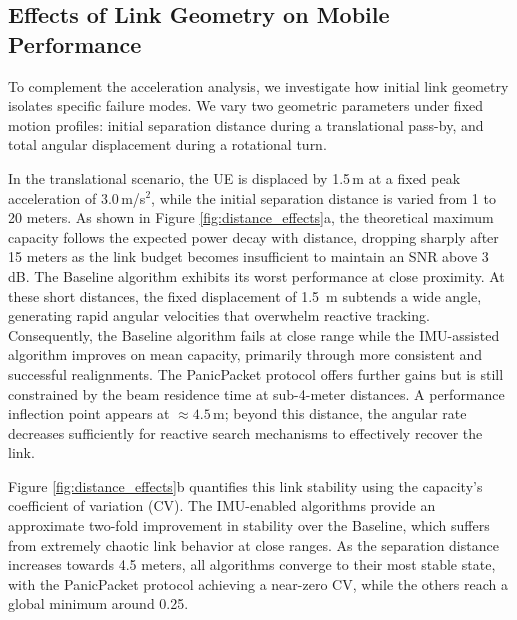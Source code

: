 \documentclass[fleqn,10pt]{wlscirep}
\begin{document}
\subsection*{Effects of Link Geometry on Mobile Performance}

To complement the acceleration analysis, we investigate how initial link geometry isolates specific failure modes. We vary two geometric parameters under fixed motion profiles: initial separation distance during a translational pass-by, and total angular displacement during a rotational turn.

In the translational scenario, the UE is displaced by 1.5\,m at a fixed peak acceleration of 3.0\,m/s$^2$, while the initial separation distance is varied from 1 to 20 meters. As shown in Figure \ref{fig:distance_effects}a, the theoretical maximum capacity follows the expected power decay with distance, dropping sharply after 15 meters as the link budget becomes insufficient to maintain an SNR above 3\,dB. The Baseline algorithm exhibits its worst performance at close proximity. At these short distances, the fixed displacement of 1.5 \,m subtends a wide angle, generating rapid angular velocities that overwhelm reactive tracking. Consequently, the Baseline algorithm fails at close range while the IMU-assisted algorithm improves on mean capacity, primarily through more consistent and successful realignments. The PanicPacket protocol offers further gains but is still constrained by the beam residence time at sub-4-meter distances. A performance inflection point appears at $\approx 4.5$\,m; beyond this distance, the angular rate decreases sufficiently for reactive search mechanisms to effectively recover the link.

Figure \ref{fig:distance_effects}b quantifies this link stability using the capacity's coefficient of variation (CV). The IMU-enabled algorithms provide an approximate two-fold improvement in stability over the Baseline, which suffers from extremely chaotic link behavior at close ranges. As the separation distance increases towards 4.5 meters, all algorithms converge to their most stable state, with the PanicPacket protocol achieving a near-zero CV, while the others reach a global minimum around 0.25.
\end{document}

